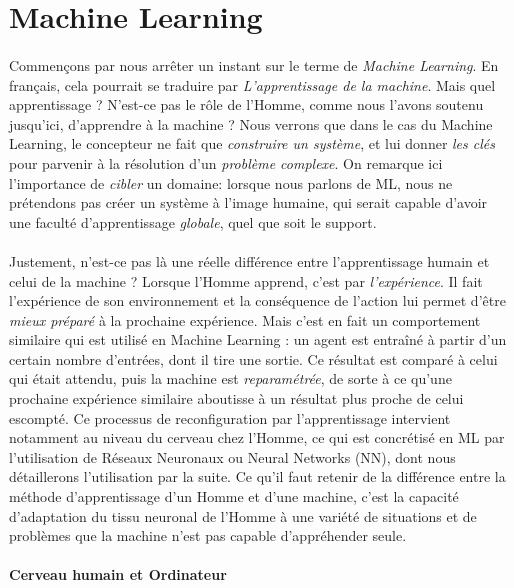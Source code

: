\section{Machine Learning}

\paragraph{} Commençons par nous arrêter un instant sur le terme de \emph{Machine Learning}. En français,
cela pourrait se traduire par \emph{L'apprentissage de la machine}. Mais quel apprentissage ? N'est-ce pas
le rôle de l'Homme, comme nous l'avons soutenu jusqu'ici, d'apprendre à la machine ? Nous verrons que dans
le cas du Machine Learning, le concepteur ne fait que \emph{construire un système}, et lui donner
\emph{les clés} pour parvenir à la résolution d'un \emph{problème complexe}. On remarque ici l'importance
de \emph{cibler} un domaine: lorsque nous parlons de ML, nous ne prétendons pas créer un système à l'image
humaine, qui serait capable d'avoir une faculté d'apprentissage \emph{globale}, quel que soit le support. 

\paragraph{} Justement, n'est-ce pas là une réelle différence entre l'apprentissage humain et celui de la machine ?
Lorsque l'Homme apprend, c'est par \emph{l'expérience}. Il fait l'expérience de son environnement et la
conséquence de l'action lui permet d'être \emph{mieux préparé} à la prochaine expérience. Mais c'est en fait un
comportement similaire qui est utilisé en Machine Learning : un agent est entraîné à partir d'un certain nombre
d'entrées, dont il tire une sortie. Ce résultat est comparé à celui qui était attendu, puis la machine est
\emph{reparamétrée}, de sorte à ce qu'une prochaine expérience similaire aboutisse à un résultat plus proche 
de celui escompté. Ce processus de reconfiguration par l'apprentissage intervient notamment au niveau du cerveau
chez l'Homme, ce qui est concrétisé en ML par l'utilisation de Réseaux Neuronaux ou Neural Networks (NN), dont
nous détaillerons l'utilisation par la suite. Ce qu'il faut retenir de la différence entre la méthode d'apprentissage
d'un Homme et d'une machine, c'est la capacité d'adaptation du tissu neuronal de l'Homme à une variété de situations
et de problèmes que la machine n'est pas capable d'appréhender seule.

\paragraph{Cerveau humain et Ordinateur}

